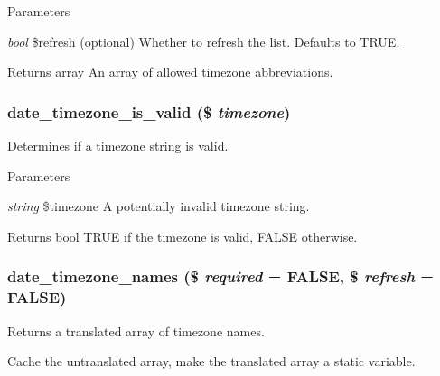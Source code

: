 \begin{DoxyParams}{Parameters}
\item[{\em bool}]\$refresh (optional) Whether to refresh the list. Defaults to TRUE.\end{DoxyParams}
\begin{DoxyReturn}{Returns}
array An array of allowed timezone abbreviations. 
\end{DoxyReturn}
\hypertarget{date__api_8module_a319c7986532f87064916552af178c58c}{
\subsubsection[{date\_\-timezone\_\-is\_\-valid}]{\setlength{\rightskip}{0pt plus 5cm}date\_\-timezone\_\-is\_\-valid (\$ {\em timezone})}}
\label{date__api_8module_a319c7986532f87064916552af178c58c}
Determines if a timezone string is valid.


\begin{DoxyParams}{Parameters}
\item[{\em string}]\$timezone A potentially invalid timezone string.\end{DoxyParams}
\begin{DoxyReturn}{Returns}
bool TRUE if the timezone is valid, FALSE otherwise. 
\end{DoxyReturn}
\hypertarget{date__api_8module_ab90af298d216e34744c9d3ee7cf7d23a}{
\subsubsection[{date\_\-timezone\_\-names}]{\setlength{\rightskip}{0pt plus 5cm}date\_\-timezone\_\-names (\$ {\em required} = {\ttfamily FALSE}, \/  \$ {\em refresh} = {\ttfamily FALSE})}}
\label{date__api_8module_ab90af298d216e34744c9d3ee7cf7d23a}
Returns a translated array of timezone names.

Cache the untranslated array, make the translated array a static variable.


